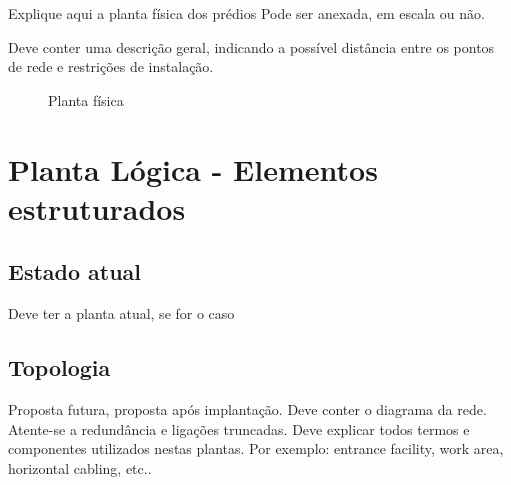 \documentclass[	DIV=calc,%
paper=a4,%
fontsize=12pt,%
onecolumn]{scrartcl}	 					%
\begin{document}
	Explique aqui a planta física dos prédios
	Pode ser anexada, em escala ou não.
	
	Deve conter uma descrição geral, indicando a possível distância entre os pontos de rede e restrições de instalação.
	\clearpage
	\recalctypearea
	
	\begin{figure}
		\noindent{}
		\caption{Planta física}
		\label{fig1}
	\end{figure}
	
	\clearpage
	\recalctypearea
	\section{Planta Lógica - Elementos estruturados}
	
	\subsection{Estado atual}
	Deve ter a planta atual, se for o caso
	
	\subsection{Topologia}
	Proposta futura, proposta após implantação.
	Deve conter o diagrama da rede. Atente-se a redundância  e ligações truncadas.
	Deve explicar todos termos e componentes utilizados nestas plantas. Por exemplo: entrance facility, work area, horizontal cabling, etc..
	
\end{document}
